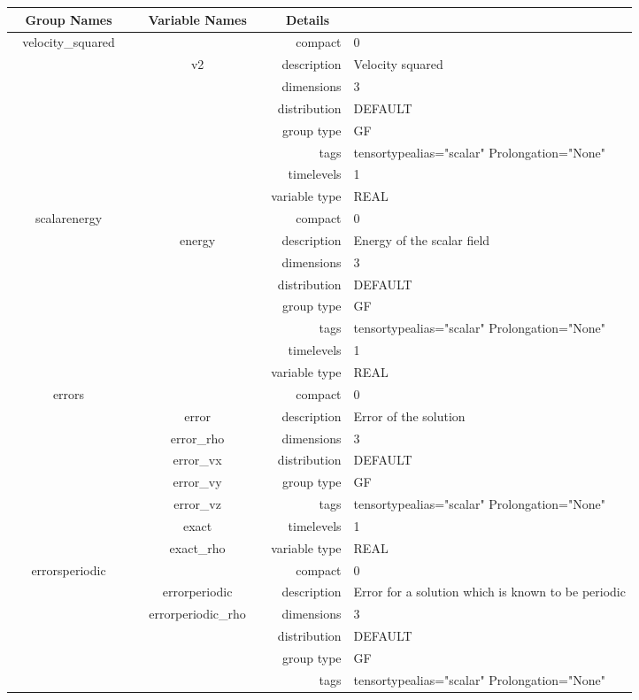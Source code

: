 \begin{tabular*}{150mm}{|c|c@{\extracolsep{\fill}}|rl|} \hline 
~ {\bf Group Names} ~ & ~ {\bf Variable Names} ~  &{\bf Details} ~ & ~ \\ 
\hline 
velocity\_squared &  & compact & 0 \\ 
 & v2 & description & Velocity squared \\ 
 &  & dimensions & 3 \\ 
 &  & distribution & DEFAULT \\ 
 &  & group type & GF \\ 
 &  & tags & tensortypealias="scalar" Prolongation="None" \\ 
 &  & timelevels & 1 \\ 
 &  & variable type & REAL \\ 
\hline 
scalarenergy &  & compact & 0 \\ 
 & energy & description & Energy of the scalar field \\ 
 &  & dimensions & 3 \\ 
 &  & distribution & DEFAULT \\ 
 &  & group type & GF \\ 
 &  & tags & tensortypealias="scalar" Prolongation="None" \\ 
 &  & timelevels & 1 \\ 
 &  & variable type & REAL \\ 
\hline 
errors &  & compact & 0 \\ 
 & error & description & Error of the solution \\ 
 & error\_rho & dimensions & 3 \\ 
 & error\_vx & distribution & DEFAULT \\ 
 & error\_vy & group type & GF \\ 
 & error\_vz & tags & tensortypealias="scalar" Prolongation="None" \\ 
 & exact & timelevels & 1 \\ 
 & exact\_rho & variable type & REAL \\ 
\hline 
errorsperiodic &  & compact & 0 \\ 
 & errorperiodic & description & Error for a solution which is known to be periodic \\ 
 & errorperiodic\_rho & dimensions & 3 \\ 
 &  & distribution & DEFAULT \\ 
 &  & group type & GF \\ 
 &  & tags & tensortypealias="scalar" Prolongation="None" \\ 

\end{tabular*}
